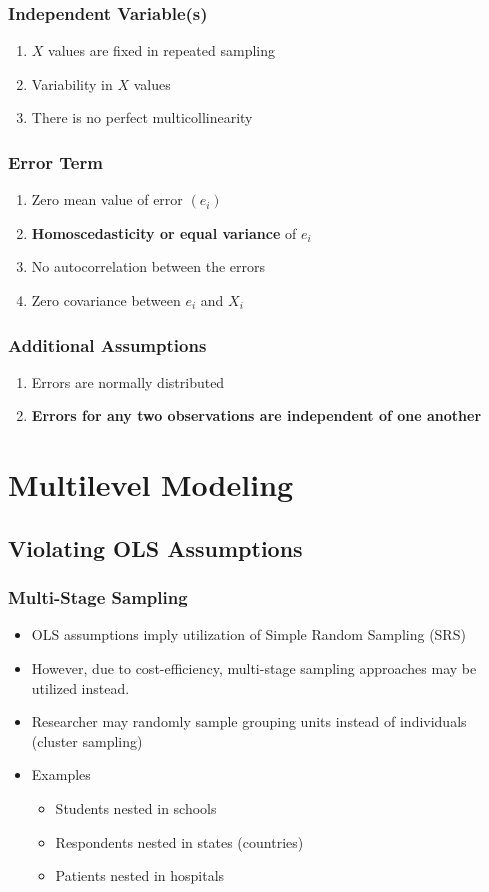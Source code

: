 \documentclass{beamer}
\begin{document}
\begin{frame}
	\frametitle{Independent Variable(s)}
		\begin{enumerate}
			\item $X$ values are fixed in repeated sampling
			\item Variability in $X$ values
			\item There is no perfect multicollinearity
		\end{enumerate}
\end{frame}

\begin{frame}
	\frametitle{Error Term}
		\begin{enumerate}
			\item Zero mean value of error $(e_i)$
			\item \textbf{Homoscedasticity or equal variance} of $e_i$
			\item No autocorrelation between the errors
			\item Zero covariance between $e_i$ and $X_i$
		\end{enumerate}
\end{frame}

\begin{frame}
	\frametitle{Additional Assumptions}
		\begin{enumerate}
			\item Errors are normally distributed
			\item \textbf{Errors for any two observations are independent of one another}
		\end{enumerate}
\end{frame}

\section{Multilevel Modeling}

\subsection{Violating OLS Assumptions}

\begin{frame}
	\frametitle{Multi-Stage Sampling}
		\begin{itemize}
			\item OLS assumptions imply utilization of Simple Random Sampling (SRS)
			\item However, due to cost-efficiency, multi-stage sampling approaches may be utilized instead.
			\item Researcher may randomly sample grouping units instead of individuals (cluster sampling)
			\item Examples
				\begin{itemize}
					\item Students nested in schools
					\item Respondents nested in states (countries)
					\item Patients nested in hospitals
				\end{itemize}
		\end{itemize}
\end{frame}
\end{document}
